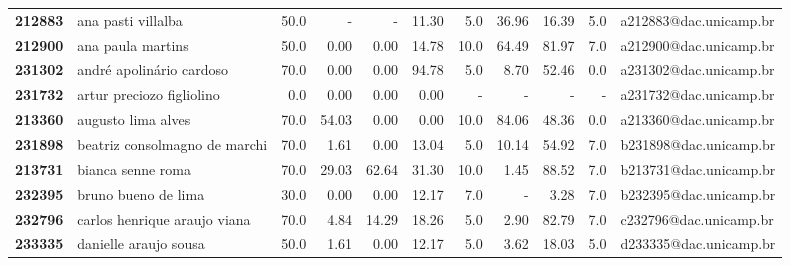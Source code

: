 \documentclass[11pt]{article}
\begin{document}
\begin{center}
\begin{landscape}
\begin{longtable}{llrrrrrrrrl}
\bottomrule
\endlastfoot
\textbf{212883} &                    ana pasti villalba &                  50.0 &           - &           - &       11.30 &                      5.0 &       36.96 &       16.39 &                        5.0 &  a212883@dac.unicamp.br \\
\textbf{212900} &                     ana paula martins &                  50.0 &        0.00 &        0.00 &       14.78 &                     10.0 &       64.49 &       81.97 &                        7.0 &  a212900@dac.unicamp.br \\
\textbf{231302} &              andré apolinário cardoso &                  70.0 &        0.00 &        0.00 &       94.78 &                      5.0 &        8.70 &       52.46 &                        0.0 &  a231302@dac.unicamp.br \\
\textbf{231732} &             artur preciozo figliolino &                   0.0 &        0.00 &        0.00 &        0.00 &                        - &           - &           - &                          - &  a231732@dac.unicamp.br \\
\textbf{213360} &                    augusto lima alves &                  70.0 &       54.03 &        0.00 &        0.00 &                     10.0 &       84.06 &       48.36 &                        0.0 &  a213360@dac.unicamp.br \\
\textbf{231898} &         beatriz consolmagno de marchi &                  70.0 &        1.61 &        0.00 &       13.04 &                      5.0 &       10.14 &       54.92 &                        7.0 &  b231898@dac.unicamp.br \\
\textbf{213731} &                     bianca senne roma &                  70.0 &       29.03 &       62.64 &       31.30 &                     10.0 &        1.45 &       88.52 &                        7.0 &  b213731@dac.unicamp.br \\
\textbf{232395} &                   bruno bueno de lima &                  30.0 &        0.00 &        0.00 &       12.17 &                      7.0 &           - &        3.28 &                        7.0 &  b232395@dac.unicamp.br \\
\textbf{232796} &          carlos henrique araujo viana &                  70.0 &        4.84 &       14.29 &       18.26 &                      5.0 &        2.90 &       82.79 &                        7.0 &  c232796@dac.unicamp.br \\
\textbf{233335} &                 danielle araujo sousa &                  50.0 &        1.61 &        0.00 &       12.17 &                      5.0 &        3.62 &       18.03 &                        5.0 &  d233335@dac.unicamp.br \\

\end{longtable}
\end{landscape}
\end{center}
\end{document}

